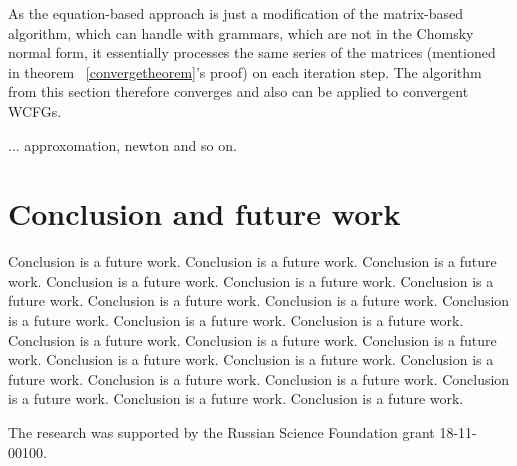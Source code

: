 \documentclass[sigconf, 10pt]{acmart}
\begin{document}
As the equation-based approach is just a modification of the matrix-based algorithm, which can handle with grammars, which are not in the Chomsky normal form, it essentially processes the same series of the matrices (mentioned in theorem ~\ref{convergetheorem}'s proof) on each iteration step. The algorithm from this section therefore converges and also can be applied to convergent WCFGs.

... approxomation, newton and so on.


\section{Conclusion and future work}

Conclusion is a future work. Conclusion is a future work. Conclusion is a future work. Conclusion is a future work. Conclusion is a future work. Conclusion is a future work. Conclusion is a future work. Conclusion is a future work. Conclusion is a future work. Conclusion is a future work. Conclusion is a future work. Conclusion is a future work. Conclusion is a future work. Conclusion is a future work. Conclusion is a future work. Conclusion is a future work. Conclusion is a future work. Conclusion is a future work. Conclusion is a future work. Conclusion is a future work. Conclusion is a future work. Conclusion is a future work.



\begin{acks}
The research was supported by the Russian Science Foundation grant 18-11-00100.
\end{acks}



\balance

\end{document}
